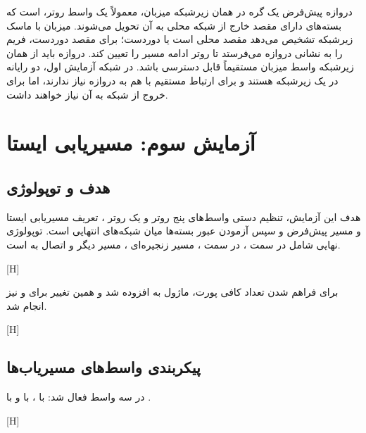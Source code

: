 دروازه پیش‌فرض یک گره در همان زیرشبکه میزبان، معمولاً یک واسط روتر، است که
بسته‌های دارای مقصد خارج از شبکه محلی به آن تحویل می‌شوند. میزبان با ماسک زیرشبکه
تشخیص می‌دهد مقصد محلی است
یا دوردست؛ برای مقصد دوردست، فریم را به نشانی  دروازه می‌فرستد تا روتر
ادامه مسیر را تعیین کند. دروازه باید از همان زیرشبکه واسط میزبان مستقیماً قابل دسترسی باشد.
در شبکه آزمایش اول، دو رایانه در یک زیرشبکه هستند و برای ارتباط مستقیم با هم به دروازه
نیاز ندارند، اما برای خروج از شبکه  به آن نیاز خواهند داشت.

\section{آزمایش سوم: مسیریابی ایستا}

\subsection{هدف و توپولوژی}

هدف این آزمایش، تنظیم دستی واسط‌های پنج روتر و یک روتر ، تعریف
مسیریابی ایستا و مسیر پیش‌فرض و سپس آزمودن عبور بسته‌ها
میان شبکه‌های انتهایی است. توپولوژی نهایی شامل  در سمت ،
 در سمت ، مسیر زنجیره‌ای ، مسیر دیگر
 و اتصال  به  است.

[H]

برای فراهم شدن تعداد کافی پورت، ماژول  به  افزوده شد و
همین تغییر برای  و  نیز انجام شد.

[H]

\subsection{پیکربندی واسط‌های مسیریاب‌ها}

در  سه واسط فعال شد:  با ،
 با  و  با .

[H]

